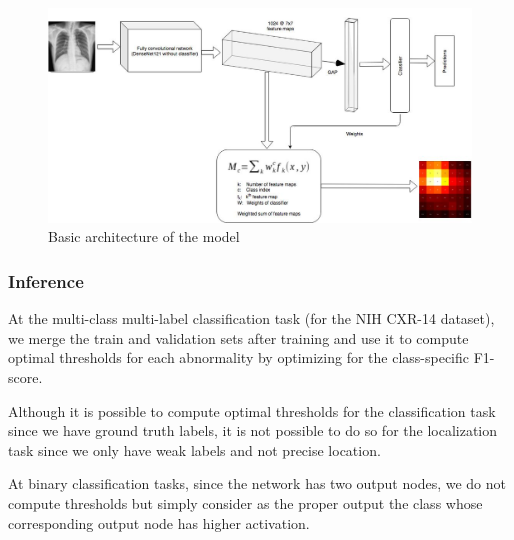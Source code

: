 \documentclass[8pt]{beamer}
\begin{document}
\begin{frame}
  \begin{figure}
    \centering \includegraphics[width=\textwidth]{images/arch}
    \caption{Basic architecture of the model}
    \label{architecture}
  \end{figure}
\end{frame}

  \begin{frame}
    \frametitle{Inference}

    At the multi-class multi-label classification task (for the NIH CXR-14
    dataset), we merge the train and validation sets after training and use it
    to compute optimal thresholds for each abnormality by optimizing for the
    class-specific F1-score.\\ \pause

    \vspace{\baselineskip}

    Although it is possible to compute optimal thresholds for the classification
    task since we have ground truth labels, it is not possible to do so for the
    localization task since we only have weak labels and not precise location.\\
    \pause

    \vspace{\baselineskip}

    At binary classification tasks, since the network has two output nodes, we
    do not compute thresholds but simply consider as the proper output the class
    whose corresponding output node has higher activation.
  \end{frame}
\end{document}
